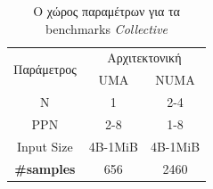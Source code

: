 \begin{table}[h]
\centering
\caption{Ο χώρος παραμέτρων για τα benchmarks \textit{Collective}}
\label{table:collectives}
\begin{tabular}{c|cc}
\multirow{2}{*}{Παράμετρος} & \multicolumn{2}{c}{Αρχιτεκτονική} \\ 
                            & UMA             & NUMA            \\ \hline \hline
N                           & 1               & 2-4             \\
PPN                         & 2-8             & 1-8             \\
Input Size                 & 4B-1MiB     & 4B-1MiB        \\ \hline
\textbf{\#samples}                   & 656              & 2460 
\end{tabular}
\end{table}




